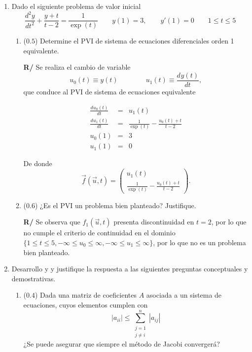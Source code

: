 \documentclass[12pt]{article}
\newcommand{\diff}[3]{\frac{d^{#3} #1}{d#2^{#3}}}
\begin{document}
\vspace{-.5cm}
  \begin{enumerate}[leftmargin=*,widest=9]
  
    \item Dado el siguiente problema de valor inicial
    \[
    \diff{y}{t}{2} + \frac{y+t}{t-2} = \frac{1}{\exp(t)} \qquad y(1) = 3, \qquad y\prime(1) = 0 \qquad 1 \leq t \leq 5
    \]     
    
    \begin{enumerate}[label=\alph*]
    \item (\(0.5\)) Determine el PVI de sistema de ecuaciones diferenciales orden 1 equivalente.
    
    \textbf{R/}    Se realiza el cambio de variable
   \[u_0(t) \equiv y(t) \qquad \qquad u_1(t) \equiv \diff{y(t)}{t}{}, \]
   que conduce al PVI de sistema de ecuaciones equivalente
   
   \begin{eqnarray*}
   \diff{u_0(t)}{t}{} &=& u_1(t)\\
   \diff{u_1(t)}{t}{} &=& \frac{1}{\exp(t)}-\frac{u_0(t)+t}{t-2}\\
   u_0(1) &=& 3 \\
   u_1(1) &=& 0
   \end{eqnarray*}
   
   De donde
   \[ \vec{f}(\vec{u}, t) = \begin{pmatrix}
   u_1(t) \\ \frac{1}{\exp(t)}-\frac{u_0(t)+t}{t-2}
\end{pmatrix}  .  \]

    \item (\(0.6\)) ¿Es el PVI un problema bien planteado? Justifique.
    
    \textbf{R/} Se observa que \(f_1(\vec{u},t)\) presenta discontinuidad en \(t= 2\), por lo que no cumple el criterio de continuidad en el dominio \(\lbrace 1 \leq t \leq 5, -\infty \leq u_0 \leq \infty, -\infty \leq u_1 \leq \infty \rbrace \), por lo que no es un problema bien planteado.
    
    \end{enumerate}
    \item Desarrollo y y justifique la respuesta a las siguientes preguntas conceptuales y demostrativas.
    \begin{enumerate}[label=\alph*]
    \item (\(0.4\)) Dada una matriz de coeficientes \(A\) asociada a un sistema de ecuaciones, cuyos elementos cumplen con 
\[
|a_{ii}| \leq \sum\limits_{\substack{j=1\\j\neq i}}^{n} |a_{ij}|
\]    
¿Se puede asegurar que siempre el método de Jacobi convergerá?


\end{enumerate}
\end{enumerate}
\end{document}

